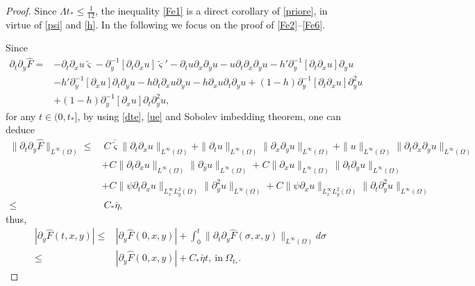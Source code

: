 \documentclass{amsart}
\numberwithin{equation}{section}
\begin{document}
\begin{proof}
Since $\Lambda t_{*}\leq \frac{1}{12}$, the inequality \eqref{Fe1} is a direct corollary of \eqref{priore}, in virtue of \eqref{psi} and \eqref{h}. In the following we focus on the proof of \eqref{Fe2}--\eqref{Fe6}.

Since
\begin{align*}
\partial_{t}\partial_{y}\hat{F}
=&-\partial_{t}\partial_{x}u\tilde{\varsigma}
  -\partial_{y}^{-1}[\partial_{t}\partial_{x}u]\tilde{\varsigma}'
  -\partial_{t}u\partial_{x}\partial_{y}u
  -u\partial_{t}\partial_{x}\partial_{y}u
  -h'\partial_{y}^{-1}[\partial_{t}\partial_{x}u]\partial_{y}u\\
 &-h'\partial_{y}^{-1}[\partial_{x}u]\partial_{t}\partial_{y}u
  -h\partial_{t}\partial_{x}u\partial_{y}u
  -h\partial_{x}u\partial_{t}\partial_{y}u
  +(1-h)\partial_{y}^{-1}[\partial_{t}\partial_{x}u]\partial_{y}^{2}u\nonumber\\
 &+(1-h)\partial_{y}^{-1}[\partial_{x}u]\partial_{t}\partial_{y}^{2}u,\nonumber
\end{align*}
for any $t\in(0,t_{*}]$, by using \eqref{dte}, \eqref{ue} and Sobolev imbedding theorem, one can deduce
\begin{align}
\|\partial_{t}\partial_{y}\hat{F}\|_{L^{\infty}(\Omega)}
\leq&~C\bar{\tilde{\varsigma}}\|\partial_{t}\partial_{x}u\|_{L^{\infty}(\Omega)}
     +\|\partial_{t}u\|_{L^{\infty}(\Omega)}\|\partial_{x}\partial_{y}u\|_{L^{\infty}(\Omega)}
     +\|u\|_{L^{\infty}(\Omega)}\|\partial_{t}\partial_{x}\partial_{y}u\|_{L^{\infty}(\Omega)}\\
    &+C\|\partial_{t}\partial_{x}u\|_{L^{\infty}(\Omega)}\|\partial_{y}u\|_{L^{\infty}(\Omega)}
     +C\|\partial_{x}u\|_{L^{\infty}(\Omega)}\|\partial_{t}\partial_{y}u\|_{L^{\infty}(\Omega)}\nonumber\\
    &+C\|\psi\partial_{t}\partial_{x}u\|_{L_{x}^{\infty}L_{y}^{2}(\Omega)}\|\partial_{y}^{2}u\|_{L^{\infty}(\Omega)}
     +C\|\psi\partial_{x}u\|_{L_{x}^{\infty}L_{y}^{2}(\Omega)}\|\partial_{t}\partial_{y}^{2}u\|_{L^{\infty}(\Omega)}\nonumber\\
\leq&~C_{*}\bar{\eta},\nonumber
\end{align}
thus,
\begin{align}\label{hatFye}
|\partial_{y}\hat{F}(t,x,y)|
\leq& |\partial_{y}\hat{F}(0,x,y)|+\int_{0}^{t}\|\partial_{t}\partial_{y}\hat{F}(\sigma,x,y)\|_{L^{\infty}(\Omega)}d\sigma\\
\leq& |\partial_{y}\hat{F}(0,x,y)|+C_{*}\bar{\eta}t,~\text{in}~\Omega_{t_{*}}.\nonumber

\end{align}
\end{proof}
\end{document}
